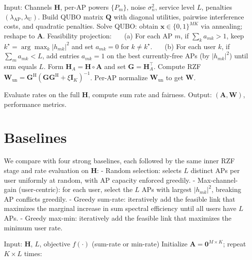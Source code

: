 {\begin{algorithm}[htbp]
\caption{Two-Level QUBO-RZF with Feasibility Projection}
\begin{algorithmic}[1]
\State Input: Channels $\mathbf{H}$, per-AP powers $\{P_m\}$, noise $\sigma_n^2$, service level $L$, penalties $(\lambda_{\text{AP}},\lambda_{\text{U}})$.
\State Build QUBO matrix $\mathbf{Q}$ with diagonal utilities, pairwise interference costs, and quadratic penalties.
\State Solve QUBO: obtain $\mathbf{x}\in\{0,1\}^{MK}$ via annealing; reshape to $\mathbf{A}$.
\State Feasibility projection:
\State ~~~(a) For each AP $m$, if $\sum_k a_{mk}>1$, keep $k^\star=\arg\max_k |h_{mk}|^2$ and set $a_{mk}=0$ for $k\neq k^\star$.
\State ~~~(b) For each user $k$, if $\sum_m a_{mk}<L$, add entries $a_{mk}=1$ on the best currently-free APs (by $|h_{mk}|^2$) until sum equals $L$.
\State Form $\mathbf{H}_A=\mathbf{H}\circ \mathbf{A}$ and set $\mathbf{G}=\mathbf{H}_A^\top$.
\State Compute RZF $\mathbf{W}_{\mathrm{un}}=\mathbf{G}^\mathrm{H}(\mathbf{G}\mathbf{G}^\mathrm{H}+\xi \mathbf{I}_K)^{-1}$.
\State Per-AP normalize $\mathbf{W}_{\mathrm{un}}$ to get $\mathbf{W}$.

\State Evaluate rates on the full $\mathbf{H}$, compute sum rate and fairness.
\State Output: $(\mathbf{A},\mathbf{W})$, performance metrics.
\end{algorithmic}
\end{algorithm}

\section{Baselines}
We compare with four strong baselines, each followed by the same inner RZF stage and rate evaluation on $\mathbf{H}$:
- Random selection: selects $L$ distinct APs per user uniformly at random, with AP capacity enforced greedily.
- Max-channel-gain (user-centric): for each user, select the $L$ APs with largest $|h_{mk}|^2$, breaking AP conflicts greedily.
- Greedy sum-rate: iteratively add the feasible link that maximizes the marginal increase in sum spectral efficiency until all users have $L$ APs.
- Greedy max-min: iteratively add the feasible link that maximizes the minimum user rate.

\begin{algorithm}[htbp]
\caption{Greedy Sum-Rate and Greedy Max-Min (Selection Only)}
\begin{algorithmic}[1]
\State Input: $\mathbf{H}$, $L$, objective $f(\cdot)$ (sum-rate or min-rate)
\State Initialize $\mathbf{A}=\mathbf{0}^{M\times K}$; repeat $K\!\times\!L$ times:


\end{algorithmic}
\end{algorithm}}
